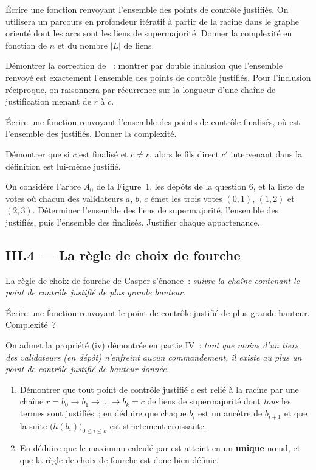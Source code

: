 \documentclass[11pt,a4paper]{article}
\begin{document}
\Q Écrire une fonction  renvoyant l'ensemble des points de
contrôle justifiés. On utilisera un parcours en profondeur itératif à partir de la racine
dans le graphe orienté dont les arcs sont les liens de supermajorité. Donner la complexité
en fonction de $n$ et du nombre $|L|$ de liens.

\Q Démontrer la correction de ~: montrer par double inclusion que
l'ensemble renvoyé est exactement l'ensemble des points de contrôle justifiés. Pour
l'inclusion réciproque, on raisonnera par récurrence sur la longueur d'une chaîne de
justification menant de $r$ à $c$.

\Q Écrire une fonction  renvoyant l'ensemble des
points de contrôle finalisés, où  est l'ensemble des justifiés. Donner la
complexité.

\Q Démontrer que si $c$ est finalisé et $c\ne r$, alors le fils direct $c'$ intervenant
dans la définition est lui-même justifié.

\Q On considère l'arbre $A_0$ de la Figure~1, les dépôts de la question 6, et la liste de
votes où chacun des validateurs $a$, $b$, $c$ émet les trois votes $(0,1)$, $(1,2)$ et
$(2,3)$. Déterminer l'ensemble des liens de supermajorité, l'ensemble des justifiés, puis
l'ensemble des finalisés. Justifier chaque appartenance.

\subsection*{III.4 --- La règle de choix de fourche}

La règle de choix de fourche de Casper s'énonce~: \emph{suivre la chaîne contenant le point
de contrôle justifié de plus grande hauteur.}

\Q Écrire une fonction  renvoyant le point de contrôle justifié de
plus grande hauteur. Complexité~?

\Q On admet la propriété (iv) démontrée en partie IV~: \emph{tant que moins d'un tiers des
validateurs (en dépôt) n'enfreint aucun commandement, il existe au plus un point de contrôle
justifié de hauteur donnée.}
\begin{enumerate}[label=(\alph*),leftmargin=2em,itemsep=1pt]
\item Démontrer que tout point de contrôle justifié $c$ est relié à la racine par une chaîne
$r=b_0\to b_1\to\dots\to b_k=c$ de liens de supermajorité dont \emph{tous} les termes sont
justifiés~; en déduire que chaque $b_i$ est un ancêtre de $b_{i+1}$ et que la suite
$\big(h(b_i)\big)_{0\le i\le k}$ est strictement croissante.
\item En déduire que le maximum calculé par  est atteint en un
\textbf{unique} n\oe ud, et que la règle de choix de fourche est donc bien définie.
\end{enumerate}
\end{document}

